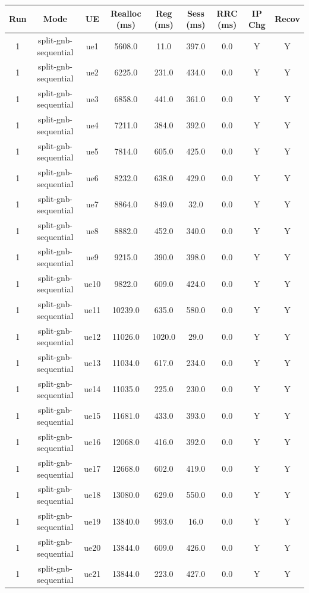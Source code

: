 \begin{table}[ht]
\centering
\begin{tabular}{|c|c|c|c|c|c|c|c|c|}
\hline
Run & Mode & UE & Realloc (ms) & Reg (ms) & Sess (ms) & RRC (ms) & IP Chg & Recov \\
\hline
1 & split-gnb-sequential & ue1 & 5608.0 & 11.0 & 397.0 & 0.0 & Y & Y \\
1 & split-gnb-sequential & ue2 & 6225.0 & 231.0 & 434.0 & 0.0 & Y & Y \\
1 & split-gnb-sequential & ue3 & 6858.0 & 441.0 & 361.0 & 0.0 & Y & Y \\
1 & split-gnb-sequential & ue4 & 7211.0 & 384.0 & 392.0 & 0.0 & Y & Y \\
1 & split-gnb-sequential & ue5 & 7814.0 & 605.0 & 425.0 & 0.0 & Y & Y \\
1 & split-gnb-sequential & ue6 & 8232.0 & 638.0 & 429.0 & 0.0 & Y & Y \\
1 & split-gnb-sequential & ue7 & 8864.0 & 849.0 & 32.0 & 0.0 & Y & Y \\
1 & split-gnb-sequential & ue8 & 8882.0 & 452.0 & 340.0 & 0.0 & Y & Y \\
1 & split-gnb-sequential & ue9 & 9215.0 & 390.0 & 398.0 & 0.0 & Y & Y \\
1 & split-gnb-sequential & ue10 & 9822.0 & 609.0 & 424.0 & 0.0 & Y & Y \\
1 & split-gnb-sequential & ue11 & 10239.0 & 635.0 & 580.0 & 0.0 & Y & Y \\
1 & split-gnb-sequential & ue12 & 11026.0 & 1020.0 & 29.0 & 0.0 & Y & Y \\
1 & split-gnb-sequential & ue13 & 11034.0 & 617.0 & 234.0 & 0.0 & Y & Y \\
1 & split-gnb-sequential & ue14 & 11035.0 & 225.0 & 230.0 & 0.0 & Y & Y \\
1 & split-gnb-sequential & ue15 & 11681.0 & 433.0 & 393.0 & 0.0 & Y & Y \\
1 & split-gnb-sequential & ue16 & 12068.0 & 416.0 & 392.0 & 0.0 & Y & Y \\
1 & split-gnb-sequential & ue17 & 12668.0 & 602.0 & 419.0 & 0.0 & Y & Y \\
1 & split-gnb-sequential & ue18 & 13080.0 & 629.0 & 550.0 & 0.0 & Y & Y \\
1 & split-gnb-sequential & ue19 & 13840.0 & 993.0 & 16.0 & 0.0 & Y & Y \\
1 & split-gnb-sequential & ue20 & 13844.0 & 609.0 & 426.0 & 0.0 & Y & Y \\
1 & split-gnb-sequential & ue21 & 13844.0 & 223.0 & 427.0 & 0.0 & Y & Y \\

\end{tabular}
\end{table}
